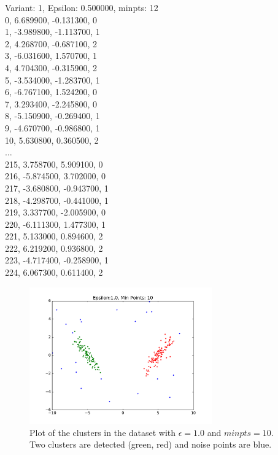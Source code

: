 \documentclass[12pt]{article}
\begin{document}
\noindent Variant: 1, Epsilon: 0.500000, minpts: 12
\\0, 6.689900, -0.131300, 0
\\1, -3.989800, -1.113700, 1
\\2, 4.268700, -0.687100, 2
\\3, -6.031600, 1.570700, 1
\\4, 4.704300, -0.315900, 2
\\5, -3.534000, -1.283700, 1
\\6, -6.767100, 1.524200, 0
\\7, 3.293400, -2.245800, 0
\\8, -5.150900, -0.269400, 1
\\9, -4.670700, -0.986800, 1
\\10, 5.630800, 0.360500, 2
\\$\ldots$
\\215, 3.758700, 5.909100, 0
\\216, -5.874500, 3.702000, 0
\\217, -3.680800, -0.943700, 1
\\218, -4.298700, -0.441000, 1
\\219, 3.337700, -2.005900, 0
\\220, -6.111300, 1.477300, 1
\\221, 5.133000, 0.894600, 2
\\222, 6.219200, 0.936800, 2
\\223, -4.717400, -0.258900, 1
\\224, 6.067300, 0.611400, 2


\begin{figure}[htp]
\centering
            \includegraphics[width=0.7\textwidth]{images/test_results_0.pdf}   
    \caption{Plot of the clusters in the dataset with $\epsilon=1.0$ and $minpts=10$. Two clusters are detected (green, red) and noise points are blue.}
   \label{fig:Variant0}
\end{figure}
\end{document}
